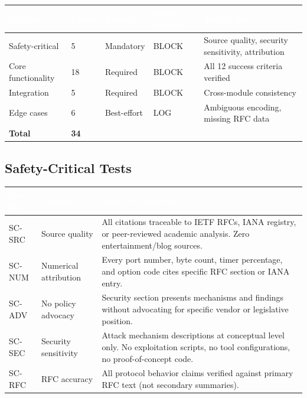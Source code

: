 \documentclass[11pt,letterpaper]{article}
\newcommand{\tableheader}[1]{\textbf{\sffamily\textcolor{white}{#1}}}
\begin{document}
\begin{center}
\begin{tabularx}{\textwidth}{L{3cm}C{1.5cm}C{1.5cm}C{2cm}X}
\toprule
{}
\tableheader{Category} & \tableheader{Count} & \tableheader{Priority} & \tableheader{Failure Action} & \tableheader{Target Area} \\
\midrule
Safety-critical & 5 & Mandatory & BLOCK & Source quality, security sensitivity, attribution \\
Core functionality & 18 & Required & BLOCK & All 12 success criteria verified \\
Integration & 5 & Required & BLOCK & Cross-module consistency \\
Edge cases & 6 & Best-effort & LOG & Ambiguous encoding, missing RFC data \\
\midrule
{}
\textbf{Total} & \textbf{34} & & & \\
\bottomrule
\end{tabularx}
\end{center}

\subsection{Safety-Critical Tests}

\begin{center}
\begin{tabularx}{\textwidth}{C{1.2cm}L{3.5cm}X}
\toprule
{}
\tableheader{Test ID} & \tableheader{Verifies} & \tableheader{Expected Behavior} \\
\midrule
SC-SRC & Source quality & All citations traceable to IETF RFCs, IANA registry, or peer-reviewed academic analysis. Zero entertainment/blog sources. \\
SC-NUM & Numerical attribution & Every port number, byte count, timer percentage, and option code cites specific RFC section or IANA entry. \\
SC-ADV & No policy advocacy & Security section presents mechanisms and findings without advocating for specific vendor or legislative position. \\
SC-SEC & Security sensitivity & Attack mechanism descriptions at conceptual level only. No exploitation scripts, no tool configurations, no proof-of-concept code. \\
SC-RFC & RFC accuracy & All protocol behavior claims verified against primary RFC text (not secondary summaries). \\
\bottomrule
\end{tabularx}
\end{center}
\end{document}
